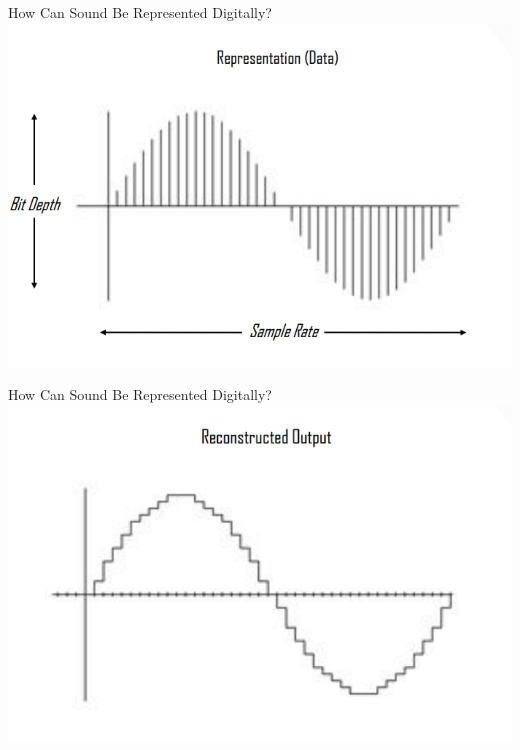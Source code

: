 \begin{frame}{How Can Sound Be Represented Digitally? }
	\includegraphics[width=\linewidth,height=0.7\textheight,keepaspectratio]{wave_axis}
\end{frame}

\begin{frame}{How Can Sound Be Represented Digitally? }
	\includegraphics[width=\linewidth,height=0.7\textheight,keepaspectratio]{wave_reconstructed}
\end{frame}